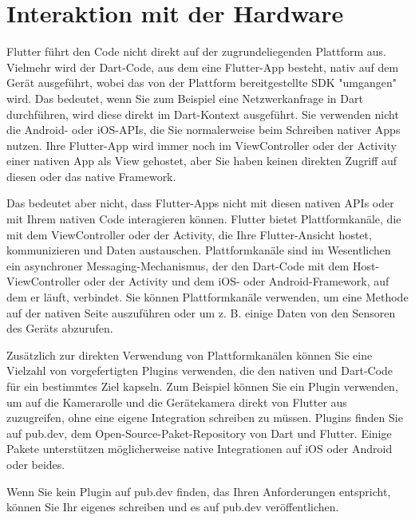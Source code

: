 \section{Interaktion mit der Hardware}

Flutter führt den Code nicht direkt auf der zugrundeliegenden Plattform aus. Vielmehr wird der Dart-Code, aus dem eine Flutter-App besteht, nativ auf dem Gerät ausgeführt, wobei das von der Plattform bereitgestellte SDK "umgangen" wird. Das bedeutet, wenn Sie zum Beispiel eine Netzwerkanfrage in Dart durchführen, wird diese direkt im Dart-Kontext ausgeführt. Sie verwenden nicht die Android- oder iOS-APIs, die Sie normalerweise beim Schreiben nativer Apps nutzen. Ihre Flutter-App wird immer noch im ViewController oder der Activity einer nativen App als View gehostet, aber Sie haben keinen direkten Zugriff auf diesen oder das native Framework.

Das bedeutet aber nicht, dass Flutter-Apps nicht mit diesen nativen APIs oder mit Ihrem nativen Code interagieren können. Flutter bietet Plattformkanäle, die mit dem ViewController oder der Activity, die Ihre Flutter-Ansicht hostet, kommunizieren und Daten austauschen. Plattformkanäle sind im Wesentlichen ein asynchroner Messaging-Mechanismus, der den Dart-Code mit dem Host-ViewController oder der Activity und dem iOS- oder Android-Framework, auf dem er läuft, verbindet. Sie können Plattformkanäle verwenden, um eine Methode auf der nativen Seite auszuführen oder um z. B. einige Daten von den Sensoren des Geräts abzurufen.

Zusätzlich zur direkten Verwendung von Plattformkanälen können Sie eine Vielzahl von vorgefertigten Plugins verwenden, die den nativen und Dart-Code für ein bestimmtes Ziel kapseln. Zum Beispiel können Sie ein Plugin verwenden, um auf die Kamerarolle und die Gerätekamera direkt von Flutter aus zuzugreifen, ohne eine eigene Integration schreiben zu müssen. Plugins finden Sie auf pub.dev, dem Open-Source-Paket-Repository von Dart und Flutter. Einige Pakete unterstützen möglicherweise native Integrationen auf iOS oder Android oder beides.

Wenn Sie kein Plugin auf pub.dev finden, das Ihren Anforderungen entspricht, können Sie Ihr eigenes schreiben und es auf pub.dev veröffentlichen.


